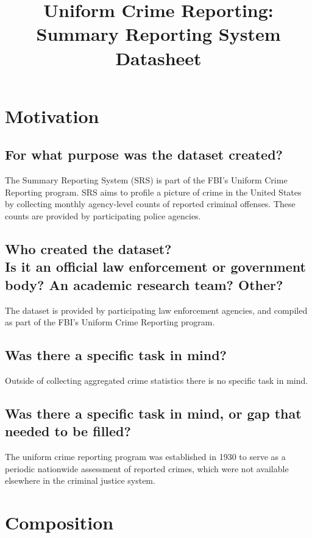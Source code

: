 \documentclass[letterpaper, 10 pt, conference]{ieeeconf}  %
\title{\LARGE \bf
Uniform Crime Reporting: Summary Reporting System \\{\color{blue}Datasheet}
}
\newcommand{\subtitle}[1]{{\\ \small \normalfont \color{purple} #1}}
\begin{document}
\maketitle
\thispagestyle{empty}
\pagestyle{empty}

\section{Motivation}

\subsection{For what purpose was the dataset created?}

The Summary Reporting System (SRS) is part of the FBI's Uniform Crime Reporting program. SRS aims to profile a picture of crime in the United States by collecting monthly agency-level counts of reported criminal offenses. These counts are provided by participating police agencies. 

\subsection{Who created the dataset? \subtitle{Is it an official law enforcement or government body? An academic research team? Other?}}

The dataset is provided by participating law enforcement agencies, and compiled as part of the FBI's Uniform Crime Reporting program.

\subsection{Was there a specific task in mind?}

Outside of collecting aggregated crime statistics there is no specific task in mind.

\subsection{Was there a specific task in mind, or gap that needed to be filled?}

The uniform crime reporting program was established in 1930 to serve as a periodic nationwide assessment of reported crimes, which were not available elsewhere in the criminal justice system.

\section{Composition}
\end{document}
